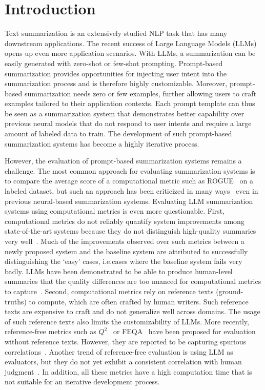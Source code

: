 \section{Introduction}
Text summarization is an extensively studied NLP task that has many downstream applications.
The recent success of Large Language Models (LLMs) opens up even more application scenarios.
With LLMs, a summarization can be easily generated with zero-shot or few-shot prompting.
Prompt-based summarization provides opportunities for injecting user intent into the summarization process and is therefore highly customizable.
Moreover, prompt-based summarization needs zero or few examples, further allowing users to craft examples tailored to their application contexts.
Each prompt template can thus be seen as a summarization system that demonstrates better capability over previous neural models that do not respond to user intents and require a large amount of labeled data to train. 
The development of such prompt-based summarization systems has become a highly iterative process.

However, the evaluation of prompt-based summarization systems remains a challenge.
The most common approach for evaluating summarization systems is to compare the average score of a computational metric such as ROGUE~\cite{lin2004rouge} on a labeled dataset, but such an approach has been criticized in many ways~\cite{deutsch2022re, bhandari2020re, peyrard2017learning, novikova2017we, durmus2020feqa} even in previous neural-based summarization systems.
Evaluating LLM summarization systems using computational metrics is even more questionable.
First, computational metrics do not reliably quantify system improvements among state-of-the-art systems because they do not distinguish high-quality summaries very well~\cite{deutsch2022re, bhandari2020re, novikova2017we}.
Much of the improvements observed over such metrics between a newly proposed system and the baseline system are attributed to successfully distinguishing the `easy' cases, i.e.cases where the baseline system fails very badly.
LLMs have been demonstrated to be able to produce human-level summaries that the quality differences are too nuanced for computational metrics to capture~\cite{zhou2022large}.
Second, computational metrics rely on reference texts (ground-truths) to compute, which are often crafted by human writers.
Such reference texts are expensive to craft and do not generalize well across domains. 
The usage of such reference texts also limits the customizability of LLMs.
More recently, reference-free metrics such as $Q^2$~\cite{honovich2021q2} or FEQA~\cite{durmus2020feqa} have been proposed for evaluation without reference texts.
However, they are reported to be capturing spurious correlations~\cite{durmus2022spurious}.
Another trend of reference-free evaluation is using LLM as evaluators, but they do not yet exhibit a consistent correlation with human judgment~\cite{zhou2022large}.
In addition, all these metrics have a high computation time that is not suitable for an iterative development process.

